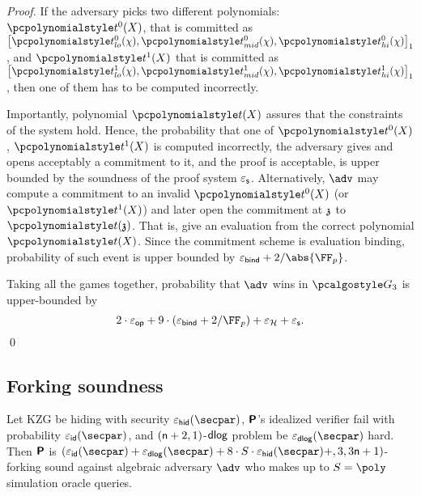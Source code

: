 \documentclass[runningheads,11pt]{llncs}
\begin{document}
\begin{proof}
  If the adversary picks two different polynomials: $\p{t^0}(X)$, that is committed
  as $\gone{\p{t^0_{lo}}(\chi), \p{t^0_{mid}}(\chi), \p{t^0_{hi}}(\chi)}$, and
  $\p{t^1}(X)$ that is committed as
  $\gone{\p{t^1_{lo}}(\chi), \p{t^1_{mid}}(\chi), \p{t^1_{hi}}(\chi)}$, then one of
  them has to be computed incorrectly. 

  Importantly, polynomial $\p{t}(X)$ assures that the constraints of the system
  hold. Hence, the probability that one of $\p{t^0}(X)$, $\p{t^1}(X)$ is computed
  incorrectly, the adversary gives and opens acceptably a commitment to it, and
  the proof is acceptable, is upper bounded by the soundness of the proof system
  $\varepsilon_{\mathsf{s}}$. Alternatively, $\adv$ may compute a commitment to an invalid
  $\p{t^0}(X)$ (or $\p{t^1}(X)$) and later open the commitment at $\mathfrak{z}$ to
  $\p{t}(\chz)$. That is, give an evaluation from the correct polynomial
  $\p{t}(X)$. Since the commitment scheme is evaluation binding, probability of
  such event is upper bounded by $\epsbinding + \infrac{2}{\abs{\FF_p}}$.

   Taking all the games together, probability that $\adv$ wins
  in $\game{3}$ is upper-bounded by
  \[
    2 \cdot \epsop + 9 \cdot (\epsbind + \infrac{2}{\FF_p}) + \epsro + \epss.
  \]
  \qed
\end{proof}

\subsection{Forking soundness}
\begin{lemma}
\label{lem:plonkprot_ss}
Let KZG be hiding with security $\epsh (\secpar)$, $\bm{\mathsf{P}}$'s idealized
verifier fail with probability $\epsid (\secpar)$, and $(\mathsf{n} + 2, 1)$-$\mathsf{dlog}$
problem be $\epsdlog (\secpar)$ hard. Then $\bm{\mathsf{P}}$ is
$(\epsid (\secpar) + \epsdlog (\secpar) + 8 \cdot S \cdot \epsh(\secpar) +
, 3, 3 \noofc + 1)$-forking sound against algebraic adversary
$\adv$ who makes up to $S = \poly$ simulation oracle queries.
\end{lemma}
\end{document}
